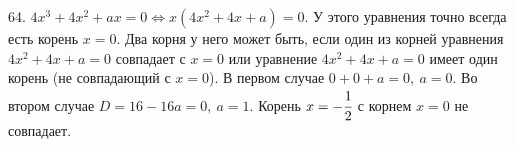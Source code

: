 64. $4x^3+4x^2+ax=0\Leftrightarrow x(4x^2+4x+a)=0.$ У этого уравнения точно всегда есть корень $x=0.$ Два корня у него может быть, если один из корней уравнения
$4x^2+4x+a=0$ совпадает с $x=0$ или уравнение $4x^2+4x+a=0$ имеет один корень (не совпадающий с $x=0$). В первом случае $0+0+a=0,\ a=0.$ Во втором случае $D=16-16a=0,\ a=1.$ Корень $x=-\cfrac{1}{2}$ с корнем $x=0$ не совпадает.\\

